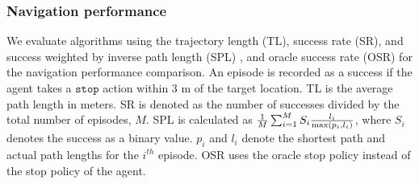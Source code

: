 \documentclass[10pt,twocolumn,letterpaper]{article}
\begin{document}
\subsubsection{Navigation performance}
\vspace{-0.15cm}
We evaluate algorithms using the trajectory length (TL), success rate (SR),
and success weighted by inverse path length (SPL)
\cite{anderson2018evaluation}, and oracle success rate (OSR) for the navigation performance comparison. An episode is recorded as a success if the agent takes a $\texttt{stop}$ action within 3 m of the target location. TL is the average path length in meters. SR is denoted as the number of successes divided by the total number of episodes, $M$. SPL is calculated as ${1\over M}\sum_{i=1}^M S_i {l_i\over{\max(p_i, l_i)}}$, where $S_i$ denotes the success as a binary value. $p_i$ and $l_i$ denote the shortest path and actual path lengths for the $i^{th}$ episode. OSR uses the oracle stop policy instead of the stop policy of the agent.\vspace{-0.1cm}
\end{document}
